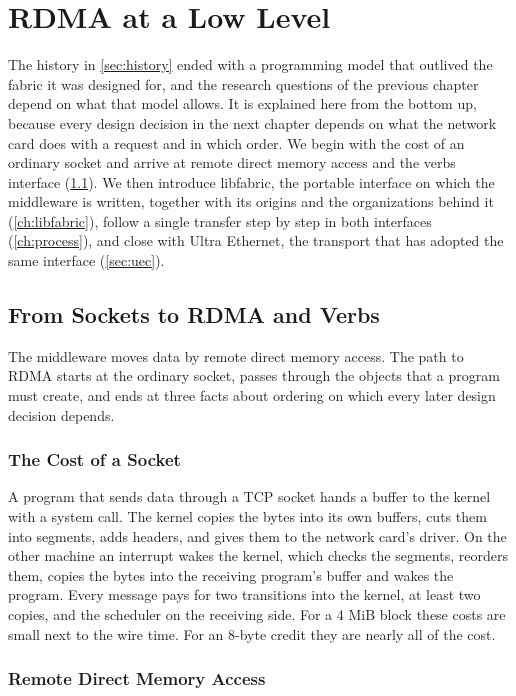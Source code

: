 \chapter{RDMA at a Low Level}
\label{ch:lowlevel}

The history in \cref{sec:history} ended with a programming model that
outlived the fabric it was designed for, and the research questions of the
previous chapter depend on what that model allows. It is explained here from
the bottom up, because every design decision in the next chapter depends on what the network card does with a request and in which order. We
begin with the cost of an ordinary socket and arrive at remote direct memory
access and the verbs interface (\cref{ch:rdma}). We then introduce
libfabric, the portable interface on which the middleware is written,
together with its origins and the organizations behind it
(\cref{ch:libfabric}), follow a single transfer step by step in both
interfaces (\cref{ch:process}), and close with Ultra Ethernet, the transport
that has adopted the same interface (\cref{sec:uec}).

\section{From Sockets to RDMA and Verbs}
\label{ch:rdma}

The middleware moves data by remote direct memory access. The path to RDMA
starts at the ordinary socket, passes through the objects that a program
must create, and ends at three facts about ordering on which every later
design decision depends.

\subsection{The Cost of a Socket}

A program that sends data through a TCP socket hands a buffer to the kernel
with a system call. The kernel copies the bytes into its own buffers, cuts
them into segments, adds headers, and gives them to the network card's
driver. On the other machine an interrupt wakes the kernel, which checks the
segments, reorders them, copies the bytes into the receiving program's buffer
and wakes the program. Every message pays for two transitions into the
kernel, at least two copies, and the scheduler on the receiving side. For a
4 MiB block these costs are small next to the wire time. For an 8-byte credit
they are nearly all of the cost.

\subsection{Remote Direct Memory Access}

